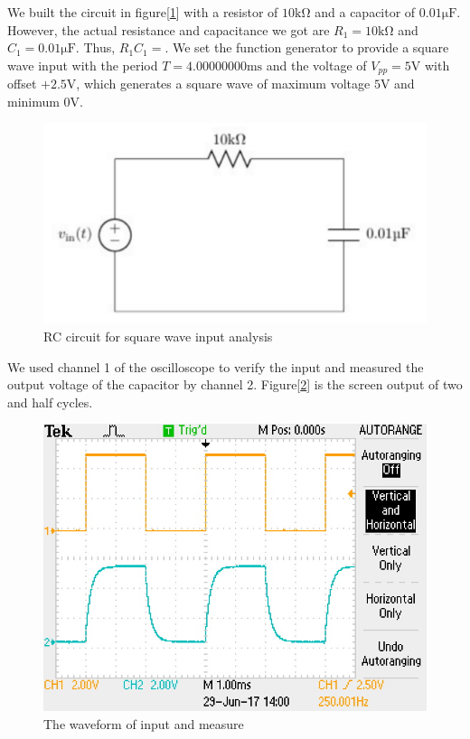 \hfill \newline
\phantom{ } We built the circuit in figure[\ref{fig:cir}] with a resistor of $10\mathrm{k\Omega}$ and a capacitor of
$0.01\mathrm{\mu F}$. However, the actual resistance and capacitance we got are $R_1=10\mathrm{k\Omega}$ and $C_1=0.01\mathrm{\mu F}$. Thus, $R_1C_1=$. \newline
\phantom{ } We set the function generator to provide a square wave input with the period $T=4.00000000\mathrm{ms}$ and the voltage of $V_{pp}=5\mathrm{V}$ with offset $+2.5\mathrm{V}$, which generates a square wave of maximum voltage $5\mathrm{V}$ and minimum $0\mathrm{V}$.

\begin{figure}[!htbp]
	\centering
	\includegraphics[width=\linewidth]{images/1_1.PNG}
	\caption{RC circuit for square wave input analysis}
	\label{fig:cir}
\end{figure}

We used channel 1 of the oscilloscope to verify the input and measured the output voltage of the capacitor by channel 2. Figure[\ref{fig:osc1}] is the screen output of two and half cycles.

\begin{figure}[!htbp]
	\centering
	\includegraphics[width=0.95\linewidth]{images/1_2.JPG}
	\caption{The waveform of input and measure}
	\label{fig:osc1}
\end{figure}

